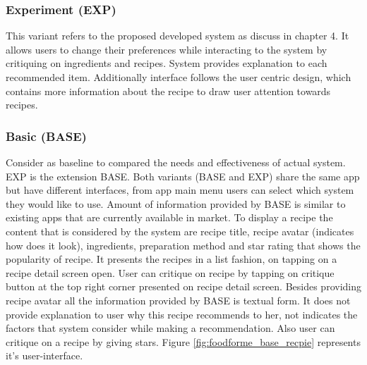 \subsubsection{Experiment (EXP)} 
This variant refers to the proposed developed system as discuss in chapter 4. It allows users to change their preferences while interacting to the system by critiquing on ingredients and recipes. System provides explanation to each recommended item. Additionally interface follows the user centric design, which contains more information about the recipe to draw user attention towards recipes.
	
	\subsubsection{Basic (BASE)}
Consider as baseline to compared the needs and effectiveness of actual system. EXP is the extension BASE.  Both variants (BASE and EXP) share the same app but have different interfaces, from app main menu users can select which system they would like to use. Amount of information provided by BASE is similar to existing apps that are currently available in market. To display a recipe the content that is considered by the system are recipe title, recipe avatar (indicates how does it look), ingredients, preparation method and star rating that shows the popularity of recipe. It presents the recipes in a list fashion, on tapping on a recipe detail screen open. User can critique on recipe by tapping on critique button at the top right corner presented on recipe detail screen.  Besides providing recipe avatar all the information provided by BASE is textual form. It does not provide explanation to user why this recipe recommends to her, not indicates the factors that system consider while making a recommendation. Also user can critique on a recipe by giving stars. Figure \ref{fig:foodforme_base_recpie} represents it's user-interface. 

